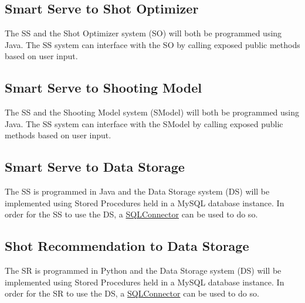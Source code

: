 \documentclass[11pt]{article}
\begin{document}
\subsection{Smart Serve to Shot Optimizer}
The SS and the Shot Optimizer system (SO) will both be programmed using Java. The SS system can interface with the SO by calling exposed public methods based on user input.
\subsection{Smart Serve to Shooting Model}
The SS and the Shooting Model system (SModel) will both be programmed using Java. The SS system can interface with the SModel by calling exposed public methods based on user input.
\subsection{Smart Serve to Data Storage}
The SS is programmed in Java and the Data Storage system (DS) will be implemented using Stored Procedures held in a MySQL database instance. In order for the SS to use the DS, a \href{https://dev.mysql.com/downloads/connector/j/5.1.html}{SQLConnector} can be used to do so. 
\subsection{Shot Recommendation to Data Storage}
The SR is programmed in Python and the Data Storage system (DS) will be implemented using Stored Procedures held in a MySQL database instance. In order for the SR to use the DS, a \href{https://dev.mysql.com/doc/connector-python/en/}{SQLConnector} can be used to do so. 
\end{document}
